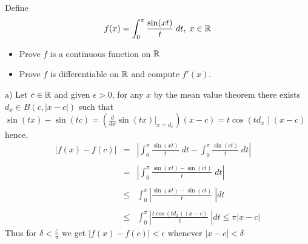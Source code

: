 \begin{problem}
Define 
    \[f(x) = \int_0^\pi \frac{\sin(xt)}{t} \; dt , \; x\in \mathbb{R}\]
    \begin{itemize}
        \item [(a)] Prove $f$ is a continuous function on $\mathbb{R}$
        \item [(b)] Prove $f$ is differentiable on $\mathbb{R}$ and compute $f'(x)$. 
    \end{itemize}
\begin{solution}
a) Let $c\in \mathbb{R}$ and given $\epsilon > 0$, for any $x$ by the mean value theorem there exists $d_x\in B(c,|x-c|)$ such that $\sin(tx) - \sin(tc)= \left(\frac{d}{dx} \sin(tx)|_{x=d_x}\right) (x-c) = t\cos(td_x)(x-c) $ hence,
    \[\begin{array}{rcl}\displaystyle \left|f(x)-f(c) \right|&=& \displaystyle\left|\int_0^\pi \frac{\sin(xt)}{t} \; dt - \int_0^\pi \frac{\sin(ct)}{t} \; dt \right| \\ \\ 
    &=& \displaystyle\left|\int_0^\pi \frac{\sin(xt)-\sin(ct)}{t}  \; dt \right| 
    \\ \\ 
    &\leq & \displaystyle\int_0^\pi \left| \frac{\sin(xt)-\sin(ct)}{t}  \; \right|  dt 
    \\ \\ 
    &\leq & \displaystyle\int_0^\pi \left| \frac{t \cos(td_x)(x-c)}{t}  \; \right|  dt \leq \pi |x-c| 
    \end{array}\]
    Thus for $\delta < \frac{\varepsilon}{\pi} $ we get $|f(x)-f(c)|< \epsilon$ whenever $|x-c| < \delta$\newline 


\end{solution}
\end{problem}
